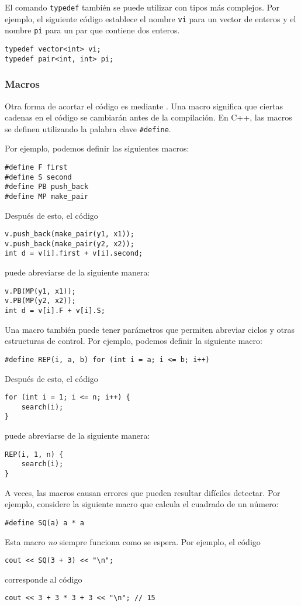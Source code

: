 El comando \texttt{typedef}
también se puede utilizar con tipos más complejos.
Por ejemplo, el siguiente código establece
el nombre \texttt{vi} para un vector de enteros
y el nombre \texttt{pi} para un par
que contiene dos enteros.
\begin{lstlisting}
typedef vector<int> vi;
typedef pair<int, int> pi;
\end{lstlisting}

\subsubsection{Macros}
Otra forma de acortar el código es mediante
.
Una macro significa que ciertas cadenas en
el código se cambiarán antes de la compilación.
En C++, las macros se definen utilizando la
palabra clave \texttt{\#define}.

Por ejemplo, podemos definir las siguientes macros:
\begin{lstlisting}
#define F first
#define S second
#define PB push_back
#define MP make_pair
\end{lstlisting}
Después de esto, el código
\begin{lstlisting}
v.push_back(make_pair(y1, x1));
v.push_back(make_pair(y2, x2));
int d = v[i].first + v[i].second;
\end{lstlisting}
puede abreviarse de la siguiente manera:
\begin{lstlisting}
v.PB(MP(y1, x1));
v.PB(MP(y2, x2));
int d = v[i].F + v[i].S;
\end{lstlisting}

Una macro también puede tener parámetros
que permiten abreviar ciclos y otras
estructuras de control.
Por ejemplo, podemos definir la siguiente macro:
\begin{lstlisting}
#define REP(i, a, b) for (int i = a; i <= b; i++)
\end{lstlisting}
Después de esto, el código
\begin{lstlisting}
for (int i = 1; i <= n; i++) {
    search(i);
}
\end{lstlisting}
puede abreviarse de la siguiente manera:
\begin{lstlisting}
REP(i, 1, n) {
    search(i);
}
\end{lstlisting}

A veces, las macros causan errores que pueden resultar difíciles
detectar. Por ejemplo, considere la siguiente macro
que calcula el cuadrado de un número:
\begin{lstlisting}
#define SQ(a) a * a
\end{lstlisting}
Esta macro \emph{no} siempre funciona como se espera.
Por ejemplo, el código
\begin{lstlisting}
cout << SQ(3 + 3) << "\n";
\end{lstlisting}
corresponde al código
\begin{lstlisting}
cout << 3 + 3 * 3 + 3 << "\n"; // 15
\end{lstlisting}

